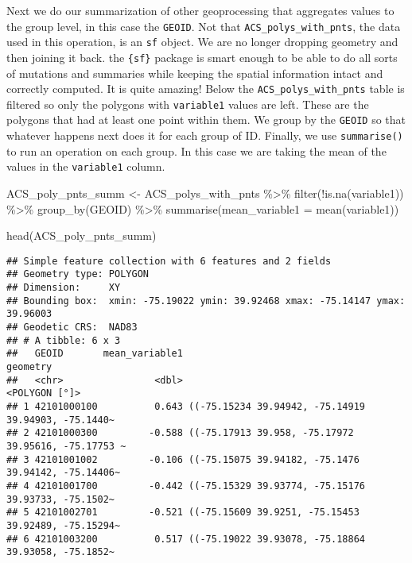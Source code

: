 \documentclass[
]{article}
\newenvironment{Shaded}{\begin{snugshade}}{\end{snugshade}}
\newcommand{\AttributeTok}[1]{\textcolor[rgb]{0.77,0.63,0.00}{#1}}
\newcommand{\FunctionTok}[1]{\textcolor[rgb]{0.00,0.00,0.00}{#1}}
\newcommand{\NormalTok}[1]{#1}
\newcommand{\OtherTok}[1]{\textcolor[rgb]{0.56,0.35,0.01}{#1}}
\newcommand{\SpecialCharTok}[1]{\textcolor[rgb]{0.00,0.00,0.00}{#1}}
\begin{document}
Next we do our summarization of other geoprocessing that aggregates
values to the group level, in this case the \texttt{GEOID}. Not that
\texttt{ACS\_polys\_with\_pnts}, the data used in this operation, is an
\texttt{sf} object. We are no longer dropping geometry and then joining
it back. the \texttt{\{sf\}} package is smart enough to be able to do
all sorts of mutations and summaries while keeping the spatial
information intact and correctly computed. It is quite amazing! Below
the \texttt{ACS\_polys\_with\_pnts} table is filtered so only the
polygons with \texttt{variable1} values are left. These are the polygons
that had at least one point within them. We group by the \texttt{GEOID}
so that whatever happens next does it for each group of ID. Finally, we
use \texttt{summarise()} to run an operation on each group. In this case
we are taking the mean of the values in the \texttt{variable1} column.

\begin{Shaded}
\begin{Highlighting}[]
\NormalTok{ACS\_poly\_pnts\_summ }\OtherTok{\textless{}{-}}\NormalTok{ ACS\_polys\_with\_pnts }\SpecialCharTok{\%\textgreater{}\%} 
  \FunctionTok{filter}\NormalTok{(}\SpecialCharTok{!}\FunctionTok{is.na}\NormalTok{(variable1)) }\SpecialCharTok{\%\textgreater{}\%} 
  \FunctionTok{group\_by}\NormalTok{(GEOID) }\SpecialCharTok{\%\textgreater{}\%} 
  \FunctionTok{summarise}\NormalTok{(}\AttributeTok{mean\_variable1 =} \FunctionTok{mean}\NormalTok{(variable1))}

\FunctionTok{head}\NormalTok{(ACS\_poly\_pnts\_summ)}
\end{Highlighting}
\end{Shaded}

\begin{verbatim}
## Simple feature collection with 6 features and 2 fields
## Geometry type: POLYGON
## Dimension:     XY
## Bounding box:  xmin: -75.19022 ymin: 39.92468 xmax: -75.14147 ymax: 39.96003
## Geodetic CRS:  NAD83
## # A tibble: 6 x 3
##   GEOID       mean_variable1                                            geometry
##   <chr>                <dbl>                                       <POLYGON [°]>
## 1 42101000100          0.643 ((-75.15234 39.94942, -75.14919 39.94903, -75.1440~
## 2 42101000300         -0.588 ((-75.17913 39.958, -75.17972 39.95616, -75.17753 ~
## 3 42101001002         -0.106 ((-75.15075 39.94182, -75.1476 39.94142, -75.14406~
## 4 42101001700         -0.442 ((-75.15329 39.93774, -75.15176 39.93733, -75.1502~
## 5 42101002701         -0.521 ((-75.15609 39.9251, -75.15453 39.92489, -75.15294~
## 6 42101003200          0.517 ((-75.19022 39.93078, -75.18864 39.93058, -75.1852~
\end{verbatim}
\end{document}
